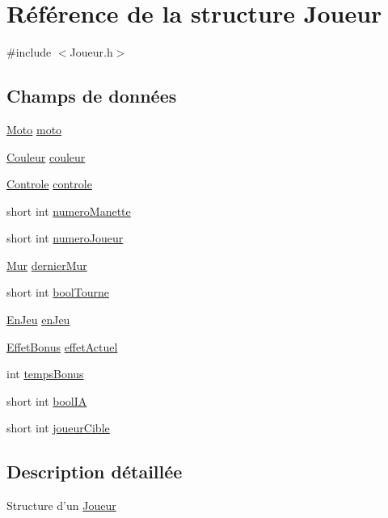 \hypertarget{struct_joueur}{\section{Référence de la structure Joueur}
\label{struct_joueur}
}


{\ttfamily \#include $<$Joueur.\-h$>$}

\subsection*{Champs de données}
\begin{DoxyCompactItemize}
\item 
\hyperlink{struct_moto}{Moto} \hyperlink{struct_joueur_af591d7daa785db91725b80343fc38fed}{moto}
\item 
\hyperlink{_couleur_8h_aa304d0ca681f782b1d7735da33037dd7}{Couleur} \hyperlink{struct_joueur_af0e152d09c13944935e00bef7a3c5111}{couleur}
\item 
\hyperlink{struct_controle}{Controle} \hyperlink{struct_joueur_a4b5b0893ad6bb731d2697ac3734d804e}{controle}
\item 
short int \hyperlink{struct_joueur_aeb402ac96372bb55a275a4166a0eb2bc}{numero\-Manette}
\item 
short int \hyperlink{struct_joueur_a63ba7cc1f1d9cf8e7a5b77d508d833c4}{numero\-Joueur}
\item 
\hyperlink{struct_mur}{Mur} \hyperlink{struct_joueur_aa553baa99ef59f8f7eb2faed9255e488}{dernier\-Mur}
\item 
short int \hyperlink{struct_joueur_a92bcbcbba7d261bcc12d14ee759c4ca1}{bool\-Tourne}
\item 
\hyperlink{_joueur_8h_a43a9f41708ce5d7ddf49e05d61f48c3b}{En\-Jeu} \hyperlink{struct_joueur_af68c300bda7f71d66df972be408b8ec9}{en\-Jeu}
\item 
\hyperlink{_effet_bonus_8h_a5c3ffd6a343fb8d5f63c87ee1a37a7fe}{Effet\-Bonus} \hyperlink{struct_joueur_a68df5c8befc6f20c5ff23f430e44bd9b}{effet\-Actuel}
\item 
int \hyperlink{struct_joueur_a679330528c11db8bed0a19f30fe323e5}{temps\-Bonus}
\item 
short int \hyperlink{struct_joueur_ad27c2d8e0b25d849fbb931f8d01b317d}{bool\-I\-A}
\item 
short int \hyperlink{struct_joueur_a92b55b201709dd3df1e01da0264d4b35}{joueur\-Cible}
\end{DoxyCompactItemize}


\subsection{Description détaillée}
Structure d'un \hyperlink{struct_joueur}{Joueur} 

